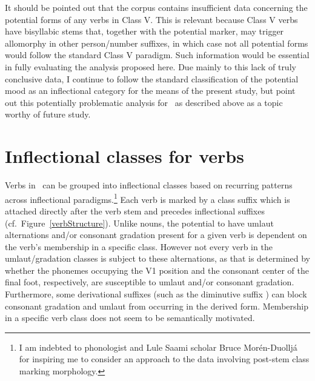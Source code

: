 It should be pointed out that the corpus contains insufficient data concerning the potential forms of any verbs in Class V. This is relevant because Class V verbs have bisyllabic stems that, together with the potential marker, may trigger allomorphy in other person/number suffixes, in which case not all potential forms would follow the standard Class V paradigm. Such information would be essential in fully evaluating the analysis proposed here. 
Due mainly to this lack of truly conclusive data, I continue to follow the standard classification of the potential mood as an inflectional category for the means of the present study, but point out this potentially problematic analysis for \PS\ as described above as a topic worthy of future study. 


\section{Inflectional classes for verbs}\label{verbInflectionalClasses}
Verbs in \PS\ can be grouped into inflectional classes based on recurring patterns across inflectional paradigms.\footnote{I am indebted to phonologist and Lule Saami scholar Bruce Morén-Duolljá for inspiring me to consider an approach to the data involving post-stem class marking morphology.} 
Each verb is marked by a class suffix which is attached directly after the verb stem and precedes inflectional suffixes (cf.~Figure~\vref{verbStructure}). %
Unlike nouns, the potential to have umlaut alternations and/or consonant gradation present for a given verb is dependent on the verb’s membership in a specific class. However not every verb in the umlaut/gradation classes is subject to these alternations, as that is determined by whether the phonemes occupying the V1 position and the consonant center of the final foot, respectively, are susceptible to umlaut and/or consonant gradation. 
Furthermore, some derivational suffixes (such as the diminutive suffix ) can block consonant gradation and umlaut from occurring in the derived form. 
Membership in a specific verb class does not seem to be semantically motivated. %


